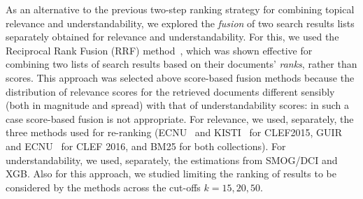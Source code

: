 \documentclass[10pt,a4paper]{article}
\begin{document}
As an alternative to the previous two-step ranking strategy for combining topical relevance and understandability, we explored the \textit{fusion} of two search results lists separately obtained for relevance and understandability. For this, we used the Reciprocal Rank Fusion (RRF) method~\cite{cormack09}, which was shown effective for combining two lists of search results based on their documents' \textit{ranks}, rather than scores. This approach was selected above score-based fusion methods
because the distribution of relevance scores for the retrieved documents different sensibly (both in magnitude and spread) with that of understandability scores: in such a case score-based fusion is not appropriate. 
For relevance, we used, separately, the three methods used for re-ranking (ECNU~\cite{song15} and KISTI~\cite{oh15} for CLEF2015, GUIR~\cite{soldaini16} and ECNU~\cite{song16} for CLEF 2016, and BM25 for both collections). For understandability, we used, separately, the estimations from SMOG/DCI and XGB. Also for this approach, we studied limiting the ranking of
results to be considered by the methods across the cut-offs $k=15, 20, 50$. 

\end{document}
